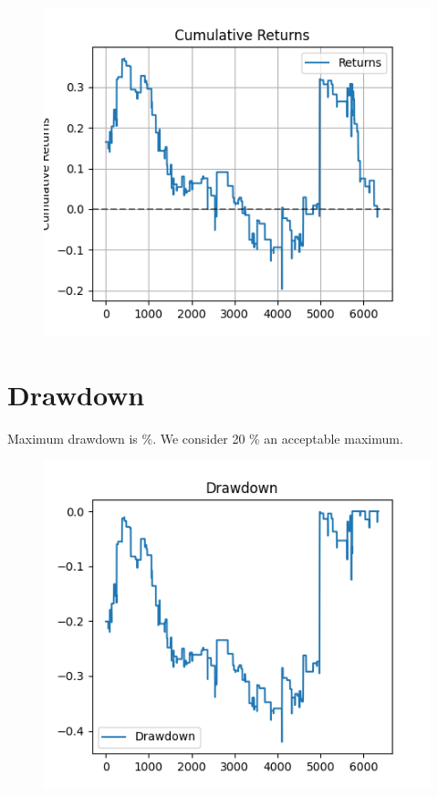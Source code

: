 \documentclass[a4paper]{article}
\begin{document}
\begin{figure}[H]
    \begin{center}
        \includegraphics{../generated/cumulative_returns.png}
    \end{center}
\end{figure}


\section{Drawdown}

Maximum drawdown is \constantMaxdrawdown \%. We consider 20 \% an acceptable maximum.

\begin{figure}[H]
    \begin{center}
        \includegraphics{../generated/drawdown.png}
    \end{center}
\end{figure}
\end{document}
